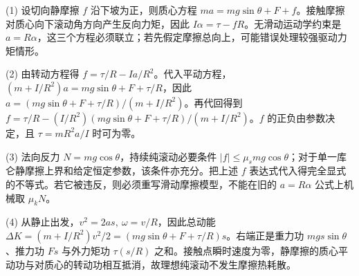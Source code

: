(1) 设切向静摩擦 \(f\) 沿下坡为正，则质心方程 \(ma=mg\sin\theta+F+f\)。接触摩擦对质心向下滚动角方向产生反向力矩，因此 \(I\alpha=\tau-fR\)。无滑动运动学约束是 \(a=R\alpha\)，这三个方程必须联立；若先假定摩擦总向上，可能错误处理较强驱动力矩情形。

(2) 由转动方程得 \(f=\tau/R-Ia/R^2\)。代入平动方程，\((m+I/R^2)a=mg\sin\theta+F+\tau/R\)，因此 \(a=(mg\sin\theta+F+\tau/R)/(m+I/R^2)\)。再代回得到 \(f=\tau/R-(I/R^2)(mg\sin\theta+F+\tau/R)/(m+I/R^2)\)。\(f\) 的正负由参数决定，且 \(\tau=mR^2a/I\) 时可为零。

(3) 法向反力 \(N=mg\cos\theta\)，持续纯滚动必要条件 \(|f|\le\mu_s mg\cos\theta\)；对于单一库仑静摩擦上界和给定恒定参数，该条件亦充分。把上述 \(f\) 表达式代入得完全显式的不等式。若它被违反，则必须重写滑动摩擦模型，不能在旧的 \(a=R\alpha\) 公式上机械取 \(\mu_kN\)。

(4) 从静止出发，\(v^2=2as,\ \omega=v/R\)，因此总动能 \(\Delta K=(m+I/R^2)v^2/2=(mg\sin\theta+F+\tau/R)s\)。右端正是重力功 \(mg s\sin\theta\)、推力功 \(Fs\) 与外力矩功 \(\tau(s/R)\) 之和。接触点瞬时速度为零，静摩擦的质心平动功与对质心的转动功相互抵消，故理想纯滚动不发生摩擦热耗散。
